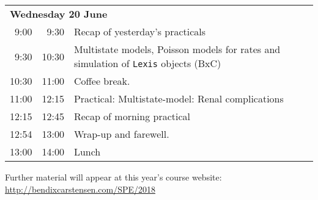 \noindent
\begin{tabular}{r@{ -- }rp{13cm}}
\multicolumn{3}{l}{\bf Wednesday 20 June} \\
 9:00 &  9:30 & Recap of yesterday's practicals \\
 9:30 & 10:30 & Multistate models, Poisson models for rates and
                simulation of \texttt{Lexis} objects (BxC)\\
10:30 & 11:00 & Coffee break. \\
11:00 & 12:15 & Practical: Multistate-model: Renal complications\\
12:15 & 12:45 & Recap of morning practical \\
12:54 & 13:00 & Wrap-up and farewell.\\
13:00 & 14:00 & Lunch \\
\end{tabular}
\vfill
\noindent
Further material will appear at this year's course website:\\ 
\url{http://bendixcarstensen.com/SPE/2018}
